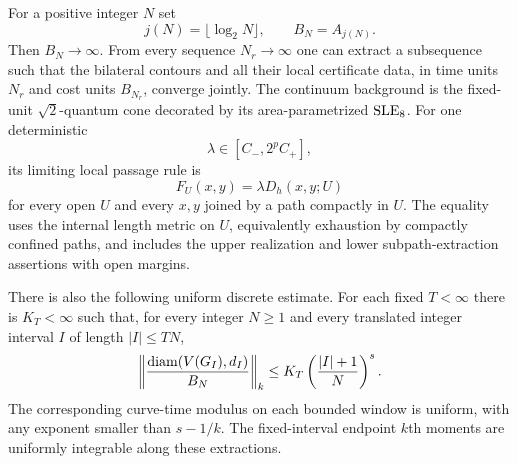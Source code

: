 \begin{theorem}
\label{tree:thm:bilateral_limit}
For a positive integer $N$ set
\[
 j(N)=\lfloor\log_2 N\rfloor,\qquad B_N=A_{j(N)}.
\]
Then $B_N\to\infty$.  From every sequence $N_r\to\infty$
one can extract a subsequence such that the bilateral
contours and all their local certificate data, in time
units $N_r$ and cost units $B_{N_r}$, converge jointly.
The continuum background is the fixed-unit
$\sqrt2$-quantum cone decorated by its area-parametrized
$\mathrm{SLE}_8$.  For one deterministic
\begin{equation}
 \lambda\in[C_-,2^p C_+],
 \label{tree:eq:bootstrap_lambda_range}
\end{equation}
its limiting local passage rule is
\begin{equation}
 F_U(x,y)=\lambda D_h(x,y;U)
 \label{tree:eq:bootstrap_bilateral_identification}
\end{equation}
for every open $U$ and every $x,y$ joined by a path
compactly in $U$.  The equality uses the internal
length metric on $U$, equivalently exhaustion by
compactly confined paths, and includes the upper
realization and lower subpath-extraction assertions
with open margins.

There is also the following uniform discrete estimate.
For each fixed $T<\infty$ there is $K_T<\infty$ such
that, for every integer $N\geq1$ and every translated
integer interval $I$ of length $|I|\leq TN$,
\begin{equation}
 \left\|\frac{\operatorname{diam}(V(G_I),d_I)}{B_N}\right\|_k
 \leq K_T\left(\frac{|I|+1}{N}\right)^s.
 \label{tree:eq:bootstrap_uniform_interval_diameter}
\end{equation}
The corresponding curve-time modulus on each bounded
window is uniform, with any exponent smaller than
$s-1/k$.  The fixed-interval endpoint $k$th moments
are uniformly integrable along these extractions.
\end{theorem}

